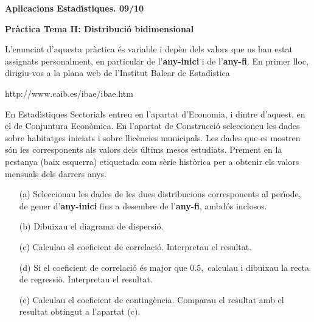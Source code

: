 \documentclass[11pt]{article}
\begin{document}
\begin{center}
\textbf{{\large{Aplicacions Estad\'{\i}stiques.  09/10}}}

\vspace{0.5cm}

\textbf{Pr\`actica Tema II: Distribuci\'o bidimensional}
\end{center} 

L'enunciat d'aquesta pr\`actica \'es variable i dep\`en dels valors que us han estat assignats personalment, en particular de l'\textbf{any-inici} i de l'\textbf{any-fi}. En primer lloc, dirigiu-vos a la plana web de l'Institut Balear de Estad\'{\i}stica 
\begin{center}
http://www.caib.es/ibae/ibae.htm
\end{center}
En Estad\'{\i}stiques Sectorials entreu en l'apartat d'Economia, i dintre d'aquest, en el de Conjuntura Econ\`omica. En l'apartat de Construcci\'o seleccioneu les dades sobre habitatges iniciats i sobre llic\`encies municipals. Les dades que es mostren s\'on les corresponents als valors dels \'ultims mesos estudiats. Prement en la pestanya (baix esquerra) etiquetada com s\`erie hist\`orica per a obtenir  els valors mensuals dels darrers anys.

\begin{itemize}
\item [(a)] Seleccionau les dades de les dues distribucions corresponents al per\'{\i}ode, de gener d'\textbf{any-inici} fins a desembre de l'\textbf{any-fi}, ambd\'os inclosos.
\item [(b)] Dibuixau el diagrama de dispersi\'o.
\item [(c)] Calculau el coeficient de correlaci\'o. Interpretau el resultat.
\item [(d)] Si el coeficient de correlaci\'o \'es major que $0.5,$ calculau i dibuixau la recta de regressi\`o. Interpretau el resultat.
\item [(e)] Calculau el coeficient de conting\`encia. Comparau el resultat amb el resultat obtingut a l'apartat (c).
\end{itemize}
\end{document}
